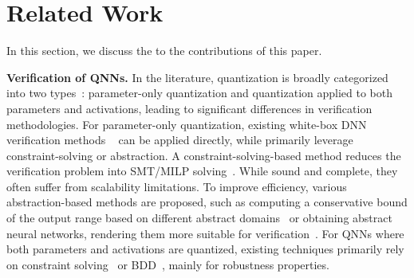 \section{Related Work}\label{sec:relatedwork}
In this section, we discuss the  to the contributions of this paper.
\vspace{2mm}

\noindent
{\bf Verification of QNNs.}
In the literature, quantization is broadly categorized into two types~\cite{gholami2021survey}: parameter-only quantization and quantization applied to both parameters and activations, leading to significant differences in verification methodologies. 
For parameter-only quantization, existing white-box DNN verification methods ~\cite{KBDJK17,LiLHY0ZXH20,betaCrown,GuoWZZSW21,backVerify22} can be applied directly, while
primarily leverage constraint-solving or abstraction. A constraint-solving-based method reduces the verification problem into 
SMT/MILP solving~\cite{KBDJK17,KatzHIJLLSTWZDK19,ChengNR17,PrabhakarA19,fischetti2018deep}. While sound and complete, they often suffer from scalability limitations. To improve efficiency, various abstraction-based methods are proposed, such as computing a conservative bound of the output range based on different abstract domains~\cite{GMDTCV18,LiLHY0ZXH20,SGMPV18,SGPV19} or obtaining abstract neural networks, rendering them more suitable for verification~\cite{AshokHKM20,ZZCSCL22,ElboherGK20,OBKatz22,LXSSXM22}. 
For QNNs where both parameters and activations are quantized, existing techniques primarily rely on constraint solving~\cite{GiacobbeHL20,scaleQNN21,huang2023towards,zhang2023qebverif} or BDD~\cite{BDD4BNN,zhang2023precise}, mainly for robustness properties. 
\vspace{2mm}

